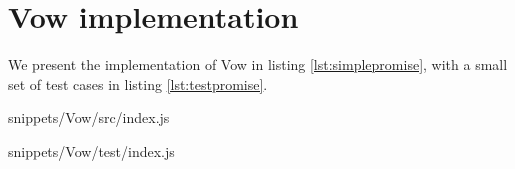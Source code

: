 \vfill\eject
\appendix

\section{Vow implementation} \label{section:voximpl}

We present the implementation of Vow in listing \ref{lst:simplepromise}, with a small set of test cases in listing \ref{lst:testpromise}.

             {snippets/Vow/src/index.js}


             {snippets/Vow/test/index.js}






